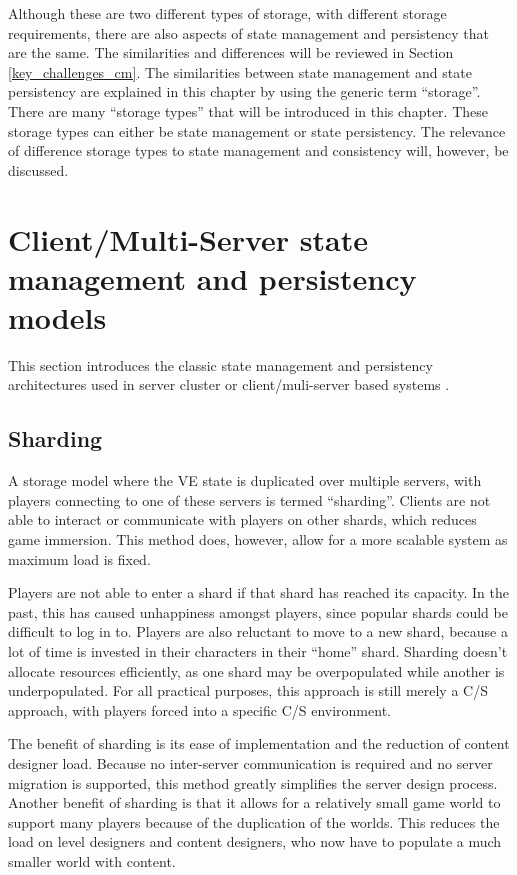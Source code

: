 Although these are two different types of storage, with different storage requirements, there are also aspects of state management and persistency that are the same. The similarities and differences will be reviewed in Section \ref{key_challenges_cm}. The similarities between state management and state persistency are explained in this chapter by using the generic term ``storage''. There are many ``storage types'' that will be introduced in this chapter. These storage types can either be state management or state persistency. The relevance of difference storage types to state management and consistency will, however, be discussed.

\section{Client/Multi-Server state management and persistency models}
\label{cms_models}

This section introduces the classic state management and persistency architectures used in server cluster or client/muli-server based systems \cite{Hu_voronoi_IM}.

\subsection{Sharding}
\label{sharding}

A storage model where the VE state is duplicated over multiple servers, with players connecting to one of these servers is termed ``sharding''. Clients are not able to interact or communicate with players on other shards, which reduces game immersion. This method does, however, allow for a more scalable system as maximum load is fixed.

Players are not able to enter a shard if that shard has reached its capacity. In the past, this has caused unhappiness amongst players, since popular
shards could be difficult to log in to. Players are also reluctant to move to a new shard, because a lot of time is invested in their characters in
their ``home'' shard. Sharding doesn't allocate resources efficiently, as one shard may be overpopulated while another is underpopulated. For all
practical purposes, this approach is still merely a C/S approach, with players forced into a specific C/S environment.

The benefit of sharding is its ease of implementation and the reduction of content designer load. Because no inter-server communication is required
and no server migration is supported, this method greatly simplifies the server design process. Another benefit of sharding is that it allows for a
relatively small game world to support many players because of the duplication of the worlds. This reduces the load on level designers and content
designers, who now have to populate a much smaller world with content.

